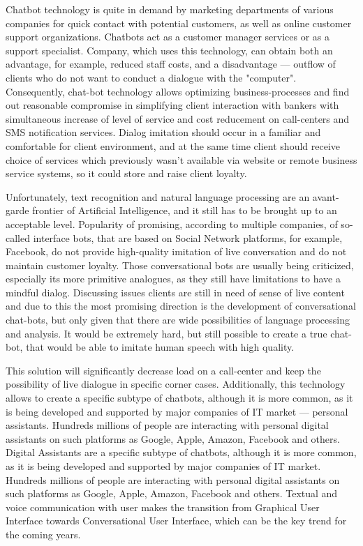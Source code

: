 Chatbot technology is quite in demand by marketing departments of various companies for quick contact with potential customers, as well as online customer support organizations.
Chatbots act as a customer manager services or as a support specialist.
Company, which uses this technology, can obtain both an advantage, for example, reduced staff costs, and a disadvantage — outflow of clients who do not want to conduct a dialogue with the "computer". 
Consequently, chat-bot technology allows optimizing business-processes and find out reasonable compromise in simplifying client interaction with bankers with simultaneous increase of level of service and cost reducement on call-centers and SMS notification services.
Dialog imitation should occur in a familiar and comfortable for client environment, and at the same time client should receive choice of services which previously wasn't available via website or remote business service systems, so it could store and raise client loyalty.

Unfortunately, text recognition and natural language processing are an avant-garde frontier of Artificial Intelligence, and it still has to be brought up to an acceptable level.
Popularity of promising, according to multiple companies, of so-called interface bots, that are based on Social Network platforms, for example, Facebook, do not provide high-quality imitation of live conversation and do not maintain customer loyalty.
Those conversational bots are usually being criticized, especially its more primitive analogues,  as they still have limitations to have a mindful dialog.
Discussing issues clients are still in need of sense of live content and due to this the most promising direction is the development of conversational chat-bots, but only given that there are wide possibilities of language processing and analysis.
It would be extremely hard, but still possible to create a true chat-bot, that would be able to imitate human speech with high quality.

This solution will significantly decrease load on a call-center and keep the possibility of live dialogue in specific corner cases.
Additionally, this technology allows to create a specific subtype of chatbots, although it is more common, as it is being developed and supported by major companies of IT market — personal assistants.
Hundreds millions of people are interacting with personal digital assistants on such platforms as Google, Apple, Amazon, Facebook and others.
Digital Assistants are a specific subtype of chatbots, although it is more common, as it is being developed and supported by major companies of IT market.
Hundreds millions of people are interacting with personal digital assistants on such platforms as Google, Apple, Amazon, Facebook and others.
Textual and voice communication with user makes the transition from Graphical User Interface towards Conversational User Interface, which can be the key trend for the coming years.

